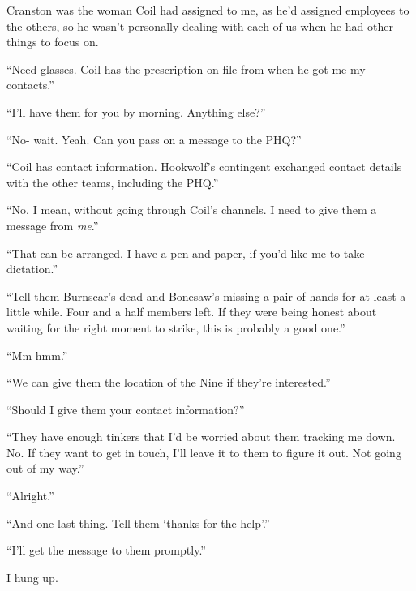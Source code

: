 Cranston was the woman Coil had assigned to me, as he'd assigned employees to the others, so he wasn't personally dealing with each of us when he had other things to focus on.



``Need glasses.  Coil has the prescription on file from when he got me my contacts.''



``I'll have them for you by morning.  Anything else?''



``No- wait.  Yeah.  Can you pass on a message to the PHQ?''



``Coil has contact information.  Hookwolf's contingent exchanged contact details with the other teams, including the PHQ.''



``No.  I mean, without going through Coil's channels.  I need to give them a message from \emph{me}.''



``That can be arranged.  I have a pen and paper, if you'd like me to take dictation.''



``Tell them Burnscar's dead and Bonesaw's missing a pair of hands for at least a little while.  Four and a half members left.  If they were being honest about waiting for the right moment to strike, this is probably a good one.''



``Mm hmm.''



``We can give them the location of the Nine if they're interested.''



``Should I give them your contact information?''



``They have enough tinkers that I'd be worried about them tracking me down.  No.  If they want to get in touch, I'll leave it to them to figure it out.  Not going out of my way.''



``Alright.''



``And one last thing.  Tell them `thanks for the help'.''



``I'll get the message to them promptly.''



I hung up.



